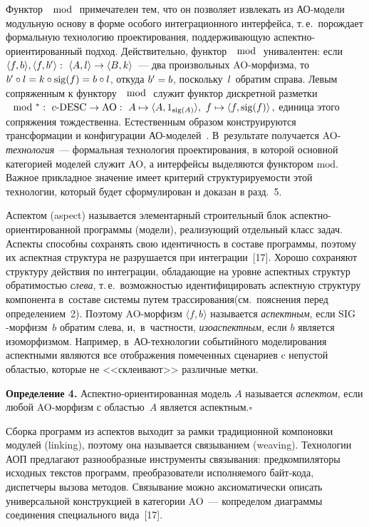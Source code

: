 \begin{multicols}{2}
 Функтор $\mod$ примечателен тем, что он позволяет извлекать из АО-модели
модульную основу в форме особого интеграционного интерфейса, т.\,е.\
порождает формальную технологию проектирования, поддерживающую
 ас\-пект\-но-ори\-ен\-ти\-ро\-ван\-ный подход. Действительно, функтор
$\mod$ унивалентен: если $\langle f, b\rangle, \langle f, b^\prime\rangle:\ \langle A,
l\rangle \hm\to \langle B, k\rangle$~--- два произвольных AO-мор\-физ\-ма, то
$b^\prime \circ l \hm= k \circ \mathrm{sig}(f) \hm= b \circ l$, откуда
$b^\prime\hm= b$,
поскольку~$l$~обратим справа. Левым сопряженным к функтору $\mod$
служит функтор дискретной разметки
 $
\mod^*:\ c\mbox{-}\mathrm{DESC} \hm\to \mathrm{AO}:\ A\mapsto \langle A, 1_{\mathrm{sig}(A)}\rangle,\ f \mapsto
\langle f, \mathrm{sig}(f)\rangle\, ,
$
единица этого сопряжения тождественна. Естественным образом
конструируются трансформации и конфигурации АО-моделей~\cite{12-kov}.
В~результате получается AO-\textit{тех\-но\-ло\-гия}~--- формальная
технология проектирования, в которой основной категорией моделей служит
AO, а интерфейсы выделяются функтором $\mathrm{mod}$. Важное прикладное
значение имеет критерий структурируемости этой технологии, который будет
сформулирован и доказан в разд.~5.

 Аспектом (aspect) называется элементарный строительный блок
 ас\-пект\-но-ори\-ен\-ти\-ро\-ван\-ной программы (модели), реализующий
отдельный класс задач. Аспекты способны сохранять свою идентичность в
составе программы, поэтому их аспектная структура не разрушается при
интеграции~[17]. Хорошо сохраняют структуру действия по интеграции,
обладающие на уровне аспектных структур обратимостью \textit{слева}, т.\,е.\
воз\-мож\-ностью идентифицировать аспектную структуру компонента в~со\-ста\-ве
системы путем трассирования\linebreak (см.\ пояснения перед определением~2). Поэтому
AO-мор\-физм $\langle f, b\rangle$ называется \textit{аспектным}, если
$\mathrm{SIG}$-мор\-физм~$b$ обратим слева, и,~в~частности, \textit{изоаспектным},
если $b$ является изоморфизмом. Например, в~АО-тех\-но\-ло\-гии
событийного моделирования аспектными являются все отображения
помеченных сценариев c непустой областью, которые не <<склеивают>>
различные метки.

 \smallskip

 \noindent
 \textbf{Определение 4.} Аспектно-ориентированная модель $A$ называется \textit{аспектом}, если
любой AO-морфизм с областью~$A$ является аспектным.\hfill$\square$

 Сборка программ из аспектов выходит за рамки традиционной компоновки
модулей (linking), поэтому она называется связыванием (weaving). Технологии
АОП предлагают разнообразные инструменты связывания: предкомпиляторы
исходных текстов программ, преобразователи исполняемого байт-ко\-да,
диспетчеры вызова методов. Связывание можно аксиоматически описать
универсальной конструкцией в категории AO~--- копределом диаграммы
соединения специального вида~[17].


\end{multicols}
